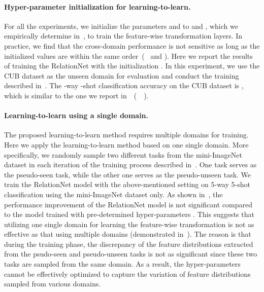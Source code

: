 \paragraph{Hyper-parameter initialization for learning-to-learn.}
For all the experiments, we initialize the parameters  and  to  and , which we empirically determine in~, to train the feature-wise transformation layers. 
In practice, we find that the cross-domain performance is not sensitive as long as the initialized values are within the same order~(\eg~ and ). 
Here we report the results of training the RelationNet with the initialization .
In this experiment, we use the CUB dataset as the unseen domain for evaluation and conduct the training described in~.
The -way -shot classification accuracy on the CUB dataset is , which is similar to the one we report in~~(~\ie~).


\paragraph{Learning-to-learn using a single domain.}
The proposed learning-to-learn method requires multiple domains for training.
Here we apply the learning-to-learn method based on one single domain.
More specifically, we randomly sample two different tasks from the mini-ImageNet dataset in each iteration of the training process described in~. 
One task serves as the pseudo-seen task, while the other one serves as the pseudo-unseen task.
We train the RelationNet model with the above-mentioned setting on 5-way 5-shot classification using the mini-ImageNet dataset only. 
As shown in~, the performance improvement of the RelationNet model is not significant compared to the model trained with pre-determined hyper-parameters .
This suggests that utilizing one single domain for learning the feature-wise transformation is not as effective as that using multiple domains (demonstrated in~).
The reason is that during the training phase, the discrepancy of the feature distributions extracted from the psudo-seen and pseudo-unseen tasks is not as significant since these two tasks are sampled from the same domain.
As a result, the hyper-parameters  cannot be effectively optimized to capture the variation of feature distributions sampled from various domains.

